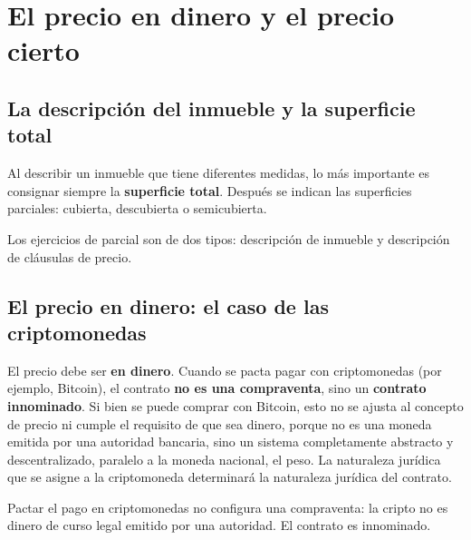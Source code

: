 \documentclass[12pt,oneside]{book}
\begin{document}
\chapter[Precio en dinero y precio cierto]{El precio en dinero y el precio cierto}

\section{La descripci\'on del inmueble y la superficie total}

Al describir un inmueble que tiene diferentes medidas, lo m\'as importante es consignar siempre la \textbf{superficie total}. Despu\'es se indican las superficies parciales: cubierta, descubierta o semicubierta.

\begin{note}
Los ejercicios de parcial son de dos tipos: descripci\'on de inmueble y descripci\'on de cl\'ausulas de precio.
\end{note}


\section{El precio en dinero: el caso de las criptomonedas}

El precio debe ser \textbf{en dinero}. Cuando se pacta pagar con criptomonedas (por ejemplo, Bitcoin), el contrato \textbf{no es una compraventa}, sino un \textbf{contrato innominado}. Si bien se puede comprar con Bitcoin, esto no se ajusta al concepto de precio ni cumple el requisito de que sea dinero, porque no es una moneda emitida por una autoridad bancaria, sino un sistema completamente abstracto y descentralizado, paralelo a la moneda nacional, el peso. La naturaleza jur\'idica que se asigne a la criptomoneda determinar\'a la naturaleza jur\'idica del contrato.

\begin{important}
Pactar el pago en criptomonedas no configura una compraventa: la cripto no es dinero de curso legal emitido por una autoridad. El contrato es innominado.
\end{important}

\end{document}
